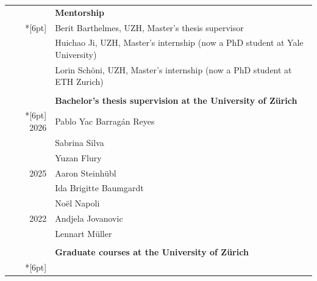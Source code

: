 \documentclass[letterpaper]{article}
\begin{document}
\begin{longtable}{rl}
       & \textbf{Mentorship}                                                                                      \\*[6pt]
       & Berit Barthelmes, UZH, Master's thesis supervisor                                                        \\
       & Huichao Ji, UZH, Master's internship (now a PhD student at Yale University)                              \\
       & Lorin Schöni, UZH, Master's internship (now a PhD student at ETH Zurich)                                 \\
       &                                                                                                          \\
       & \textbf{Bachelor's thesis supervision at the University of Zürich}                                       \\*[6pt]
       2026 & Pablo Yac Barragán Reyes                                                                                 \\
       & Sabrina Silva                                                                                            \\
       & Yuzan Flury                                                                                              \\
       2025 & Aaron Steinhübl                                                                                          \\
       & Ida Brigitte Baumgardt                                                                                   \\
       & Noël Napoli                                                                                              \\
       2022 & Andjela Jovanovic                                                                                        \\
       & Lennart Müller                                                                                           \\
       &                                                                                                          \\
       & \textbf{Graduate courses at the University of Zürich}                                                    \\*[6pt]

\end{longtable}
\end{document}
